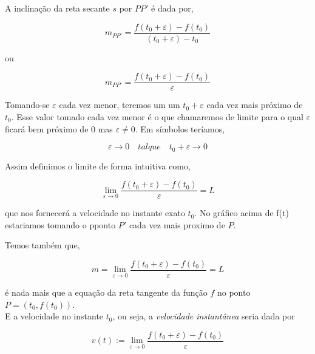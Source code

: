 \documentclass[a4paper, 12pt]{report}
\begin{document}
	A inclinação da reta secante $s$ por $PP'$ é dada por,
	
	
	$$m_{PP'} = \frac{f(t_0+\varepsilon) - f(t_0)}{(t_0 + \varepsilon) - t_0}$$
	
	
	ou
	
	\begin{equation}
	m_{PP'} = \frac{f(t_0+\varepsilon) - f(t_0)}{\varepsilon}	
	\end{equation}
	
	Tomando-se $\varepsilon$ cada vez menor, teremos um um $t_0 + \varepsilon$ cada vez mais próximo de $t_0$. Esse valor tomado cada vez menor é o que chamaremos de limite para o qual $\varepsilon$ ficará bem próximo de $0$ mas $\varepsilon \neq 0$. Em símbolos teríamos,

	$$\varepsilon \longrightarrow 0 \quad talque \quad t_0+\varepsilon \longrightarrow 0$$
	
	Assim definimos o limite de forma intuitiva como,
	
	\begin{equation}
		\lim_{\varepsilon \rightarrow 0} \frac{f(t_0+\varepsilon) - f(t_0)}{\varepsilon} = L
	\end{equation}
	
	que nos fornecerá a velocidade no instante exato $t_0$. No gráfico acima de f(t) estariamos tomando o pponto $P'$ cada vez mais proximo de $P$.
	
	Temos também que,
	
	$$ m = \lim_{\varepsilon \rightarrow 0} \frac{f(t_0+\varepsilon) - f(t_0)}{\varepsilon} = L$$
	
	é nada mais que a equação da reta tangente da função $f$ no ponto $ P = (t_0, f(t_0))$.
	\\
	
	E a velocidade no instante $t_0$, ou seja, a \textit{velocidade instantânea} seria dada por
	
	\begin{equation}
	v(t) := \lim_{\varepsilon \rightarrow 0} \frac{f(t_0+\varepsilon) - f(t_0)}{\varepsilon} 
	\end{equation}
\end{document}
